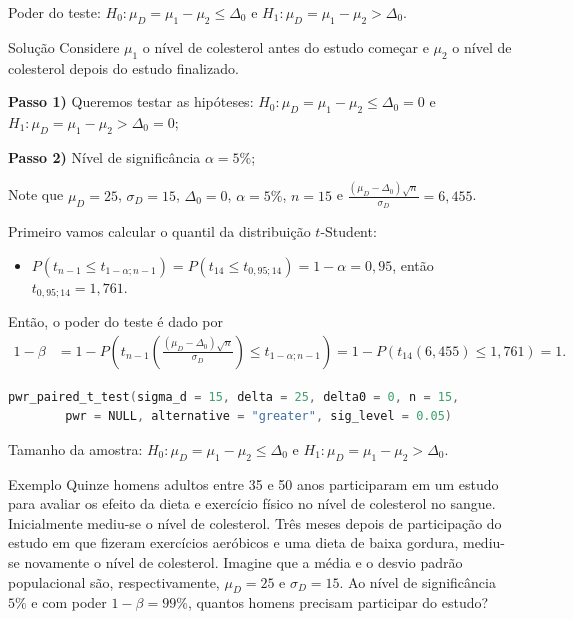 \documentclass[9pt]{beamer}
\begin{document}
\begin{frame}[fragile]{Poder do teste: $H_0:\mu_D = \mu_1 - \mu_2 \leq \Delta_0$ e $H_1:\mu_D =  \mu_1 - \mu_2 > \Delta_0$.}

\small
\begin{block}{Solução}
	Considere $\mu_1$ o nível de colesterol antes do estudo começar e $\mu_2$ o nível de colesterol depois do estudo finalizado.
	
	\textbf{Passo 1)} Queremos testar as hipóteses: $H_0: \mu_D = \mu_1 - \mu_2 \leq \Delta_0=0$ e $H_1:\mu_D = \mu_1 - \mu_2 > \Delta_0 = 0$;
	
	\textbf{Passo 2)} Nível de significância $\alpha=5\%$;
	
	Note que $\mu_D = 25$, $\sigma_D = 15$, $\Delta_0 = 0$, $\alpha=5\%$, $n=15$ e $\frac{(\mu_D - \Delta_0)\sqrt{n}}{\sigma_D} = 6,455$.
	
	Primeiro vamos calcular o quantil da distribuição $t$-Student:
	\begin{itemize}
		\item $P(t_{n-1} \leq t_{1-\alpha; n-1}) = P(t_{14} \leq t_{0,95; 14}) = 1-\alpha = 0,95$, então $t_{0,95; 14} = 1,761$.
	\end{itemize}

	Então, o poder do teste é dado por
	\begin{align*}
	1-\beta &= 1 - P\left( t_{n-1}\left( \frac{(\mu_D - \Delta_0)\sqrt{n}}{\sigma_D} \right) \leq t_{1-\alpha;n-1} \right) = 1 - P\left( t_{14}\left(6,455 \right) \leq 1,761 \right)  = 1.
	\end{align*}
\end{block}

\begin{lstlisting}[language = C, caption = Código no R.]
pwr_paired_t_test(sigma_d = 15, delta = 25, delta0 = 0, n = 15,
		pwr = NULL, alternative = "greater", sig_level = 0.05)
\end{lstlisting}

\normalsize
\end{frame}

\begin{frame}{Tamanho da amostra: $H_0:\mu_D = \mu_1 - \mu_2 \leq \Delta_0$ e $H_1:\mu_D =  \mu_1 - \mu_2 > \Delta_0$.}

\large
\begin{block}{Exemplo}
	Quinze homens adultos entre 35 e 50 anos participaram em um estudo para avaliar os efeito da dieta e exercício físico no nível de colesterol no sangue. Inicialmente mediu-se o nível de colesterol. Três meses depois de participação do estudo em que fizeram exercícios aeróbicos e uma dieta de baixa gordura,  mediu-se novamente o nível de colesterol. Imagine que a média e o desvio padrão populacional são, respectivamente, $\mu_D = 25$ e $\sigma_D = 15$.  Ao nível de significância $5\%$ e com poder $1-\beta=99\%$, quantos homens precisam participar do estudo?
\end{block}
\normalsize

\end{frame}
\end{document}
